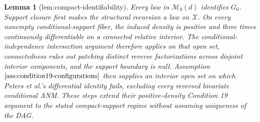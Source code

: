 \documentclass{article}
\newtheorem{lemma}{Lemma}
\begin{document}
\begin{lemma}[lem:compact-identifiability]\label{lem:compact-identifiability}
Every law in \(\mathcal M_0(d)\) identifies \(G_0\). Support closure first makes the structural recursion a law on \(\mathcal X\). On every nonempty conditional-support fiber, the induced density is positive and three times continuously differentiable on a connected relative interior. The conditional-independence intersection argument therefore applies on that open set, connectedness rules out patching distinct reverse factorizations across disjoint interior components, and the support boundary is null. Assumption \(\ref{ass:condition19-configurations}\) then supplies an interior open set on which Peters et al.'s differential identity fails, excluding every reversed bivariate conditional ANM. These steps extend their positive-density Condition 19 argument to the stated compact-support regime without assuming uniqueness of the DAG.
\end{lemma}
\end{document}
